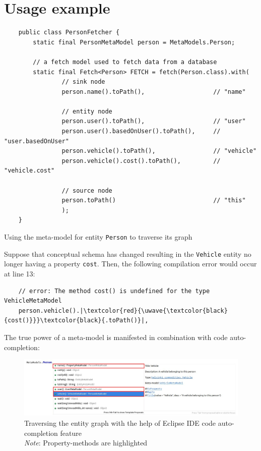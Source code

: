 \section{Usage example}
\begin{listing}[H]
    \begin{verbatim}
    public class PersonFetcher {
        static final PersonMetaModel person = MetaModels.Person;
            
        // a fetch model used to fetch data from a database
        static final Fetch<Person> FETCH = fetch(Person.class).with(
                // sink node
                person.name().toPath(),                   // "name"

                // entity node
                person.user().toPath(),                   // "user"
                person.user().basedOnUser().toPath(),     // "user.basedOnUser"
                person.vehicle().toPath(),                // "vehicle"
                person.vehicle().cost().toPath(),         // "vehicle.cost"

                // source node
                person.toPath()                           // "this"
                );
    }
    \end{verbatim}
    \caption{Using the meta-model for entity \texttt{Person} to traverse its graph}
    \label{lst:person_meta-model_usage}
\end{listing}

Suppose that conceptual schema has changed resulting in the \texttt{Vehicle} entity no longer having a property \texttt{cost}. Then, the following compilation error would occur at line 13:
\begin{verbatim}
    // error: The method cost() is undefined for the type VehicleMetaModel
    person.vehicle().|\textcolor{red}{\uwave{\textcolor{black}{cost()}}}\textcolor{black}{.toPath()}|,
\end{verbatim}

\n

The true power of a meta-model is manifested in combination with code auto-completion:

\begin{figure}[H]\centering
    \includegraphics[scale=0.5]{images/eclipse-hl.jpg}
    \caption[Traversing the entity graph with the help of Eclipse IDE code auto-completion feature]{Traversing the entity graph with the help of Eclipse IDE code auto-completion feature
    \\
    \textit{Note}: Property-methods are highlighted}\label{fig:meta-model_uml}
\end{figure}


